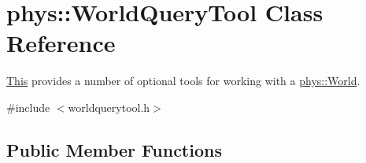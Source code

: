\hypertarget{classphys_1_1WorldQueryTool}{
\section{phys::WorldQueryTool Class Reference}
\label{d8/d69/classphys_1_1WorldQueryTool}
}


\hyperlink{structThis}{This} provides a number of optional tools for working with a \hyperlink{classphys_1_1World}{phys::World}.  




{\ttfamily \#include $<$worldquerytool.h$>$}

\subsection*{Public Member Functions}
